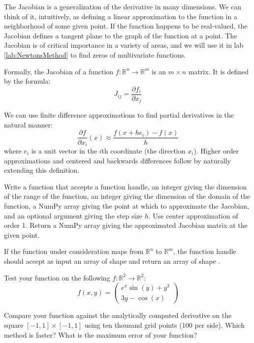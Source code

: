 \label{Ch:Multivariate Finite Difference Schemes}


The Jacobian is a generalization of the derivative in many dimensions. We can think of it, 
intuitively, as defining a linear approximation to the function in a neighborhood of some given
point. If the function happens to be real-valued, the Jacobian defines a tangent plane to the graph of 
the function at a point. 
The Jacobian is of critical importance in a variety of areas, and we will use it in lab \ref{lab:NewtonsMethod}
to find zeros of multivariate functions.

Formally, the Jacobian of a function $f:\mathbb{R}^n \rightarrow \mathbb{R}^m$ is an $m \times n$ matrix. It is defined by the formula:
\begin{equation*}
J_{ij} = \frac{\partial f_i}{\partial x_j}
\end{equation*}

We can use finite difference approximations to find partial derivatives in the natural manner:
\begin{equation*}
\frac{\partial f}{\partial x_i} (x) \approx \frac{f(x+h e_i)-f(x)}{h}
\end{equation*}
where $e_i$ is a unit vector in the $i$th coordinate (the direction $x_i$). Higher order approximations and centered and backwards differences follow by naturally extending this definition.

\begin{problem}
Write a function  that accepts a function handle, an integer giving the dimension of the
range of the function, an integer giving the dimension of the domain of the function, a NumPy array giving
the point at which to approximate the Jacobian, and an optional argument giving the step size $h$. Use center approximation of order 1.
Return a NumPy array giving the approximated Jacobian matrix at the given point.

If the function under consideration maps from $\mathbb{R}^n$ to $\mathbb{R}^m$, the function handle should
accept as input an array of shape  and return an array of shape .

Test your function on the following $f: \mathbb{R}^2 \to \mathbb{R}^2$:
\begin{equation*}
f(x, y) =
\begin{pmatrix}
e^{x} \sin(y) + y^3 \\
3y - \cos(x)
\end{pmatrix}
\end{equation*}

Compare your  function against the analytically computed derivative on the square $[-1,1] \times [-1,1]$ using ten thousand grid points (100 per side). Which method is faster? What is the maximum error of your function?
\end{problem}

